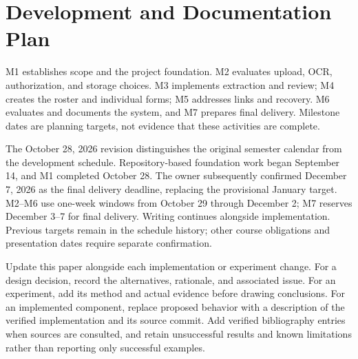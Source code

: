 \section{Development and Documentation Plan}
M1 establishes scope and the project foundation. M2 evaluates upload, OCR,
authorization, and storage choices. M3 implements extraction and review; M4
creates the roster and individual forms; M5 addresses links and recovery.
M6 evaluates and documents the system, and M7 prepares final delivery. Milestone
dates are planning targets, not evidence that these activities are complete.

The October 28, 2026 revision distinguishes the original semester calendar from
the development schedule. Repository-based foundation work began September 14,
and M1 completed October 28. The owner subsequently confirmed December 7, 2026
as the final delivery deadline, replacing the provisional January target.
M2--M6 use one-week windows from October 29 through December 2; M7 reserves
December 3--7 for final delivery. Writing continues alongside implementation.
Previous targets remain in the schedule history; other course obligations and
presentation dates require separate confirmation.

Update this paper alongside each implementation or experiment change. For a
design decision, record the alternatives, rationale, and associated issue. For
an experiment, add its method and actual evidence before drawing conclusions.
For an implemented component, replace proposed behavior with a description of
the verified implementation and its source commit. Add verified bibliography
entries when sources are consulted, and retain unsuccessful results and known
limitations rather than reporting only successful examples.
